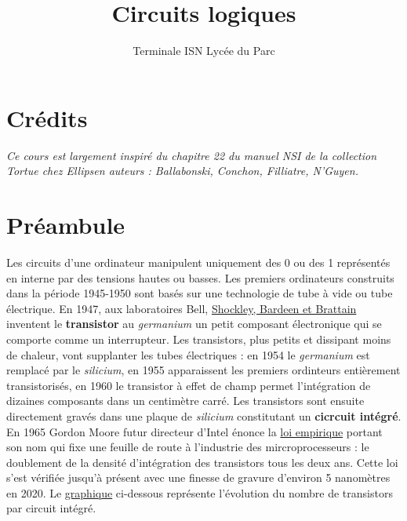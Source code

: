 \documentclass[
  11pt,
]{article}
\title{Circuits logiques}
\author{Terminale ISN Lycée du Parc}
\date{}
\newcounter{logi}
\begin{document}
\maketitle

\renewcommand*\contentsname{Table des matières}
{
\hypersetup{linkcolor=}
\setcounter{tocdepth}{3}
\tableofcontents
}
\hypertarget{cruxe9dits}{%
\section*{Crédits}\label{cruxe9dits}}

\emph{Ce cours est largement inspiré du chapitre 22 du manuel NSI de la
collection Tortue chez Ellipsen auteurs : Ballabonski, Conchon,
Filliatre, N'Guyen.}

\hypertarget{pruxe9ambule}{%
\section*{Préambule}\label{pruxe9ambule}}

Les circuits d'une ordinateur manipulent uniquement des 0 ou des 1
représentés en interne par des tensions hautes ou basses. Les premiers
ordinateurs construits dans la période 1945-1950 sont basés sur une
technologie de tube à vide ou tube électrique. En 1947, aux laboratoires
Bell, \href{https://fr.wikipedia.org/wiki/Transistor}{Shockley, Bardeen
et Brattain} inventent le \textbf{transistor} au \emph{germanium} un
petit composant électronique qui se comporte comme un interrupteur. Les
transistors, plus petits et dissipant moins de chaleur, vont supplanter
les tubes électriques : en 1954 le \emph{germanium} est remplacé par le
\emph{silicium}, en 1955 apparaissent les premiers ordinteurs
entièrement transistorisés, en 1960 le transistor à effet de champ
permet l'intégration de dizaines composants dans un centimètre carré.
Les transistors sont ensuite directement gravés dans une plaque de
\emph{silicium} constitutant un \textbf{cicrcuit intégré}. En 1965
Gordon Moore futur directeur d'Intel énonce la
\href{https://fr.wikipedia.org/wiki/Loi_de_Moore}{loi empirique} portant
son nom qui fixe une feuille de route à l'industrie des
mircroprocesseurs : le doublement de la densité d'intégration des
transistors tous les deux ans. Cette loi s'est vérifiée jusqu'à présent
avec une finesse de gravure d'environ 5 nanomètres en 2020. Le
\href{https://en.wikipedia.org/wiki/Moore\%27s_law\#/media/File:Moore's_Law_Transistor_Count_1971-2018.png}{graphique}
ci-dessous représente l'évolution du nombre de transistors par circuit
intégré.
\end{document}
